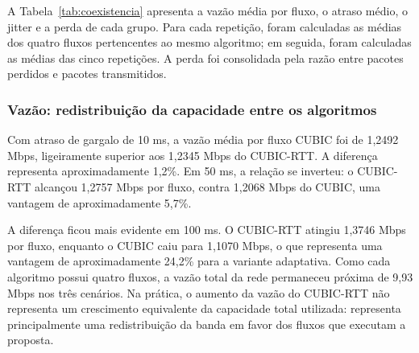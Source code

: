 \documentclass[a4paper,12pt]{monografia}
\begin{document}
A Tabela~\ref{tab:coexistencia} apresenta a vazão média por fluxo, o atraso médio, o jitter e a perda de cada grupo. Para cada repetição, foram calculadas as médias dos quatro fluxos pertencentes ao mesmo algoritmo; em seguida, foram calculadas as médias das cinco repetições. A perda foi consolidada pela razão entre pacotes perdidos e pacotes transmitidos.

\begin{table}[htbp]
\centering
\caption{Resultados médios da campanha de coexistência}
\label{tab:coexistencia}
\small
{}
\end{table}

\subsubsection{Vazão: redistribuição da capacidade entre os algoritmos}

Com atraso de gargalo de 10 ms, a vazão média por fluxo CUBIC foi de 1,2492 Mbps, ligeiramente superior aos 1,2345 Mbps do CUBIC-RTT. A diferença representa aproximadamente 1,2\%. Em 50 ms, a relação se inverteu: o CUBIC-RTT alcançou 1,2757 Mbps por fluxo, contra 1,2068 Mbps do CUBIC, uma vantagem de aproximadamente 5,7\%.

A diferença ficou mais evidente em 100 ms. O CUBIC-RTT atingiu 1,3746 Mbps por fluxo, enquanto o CUBIC caiu para 1,1070 Mbps, o que representa uma vantagem de aproximadamente 24,2\% para a variante adaptativa. Como cada algoritmo possui quatro fluxos, a vazão total da rede permaneceu próxima de 9,93 Mbps nos três cenários. Na prática, o aumento da vazão do CUBIC-RTT não representa um crescimento equivalente da capacidade total utilizada: representa principalmente uma redistribuição da banda em favor dos fluxos que executam a proposta.
\end{document}
